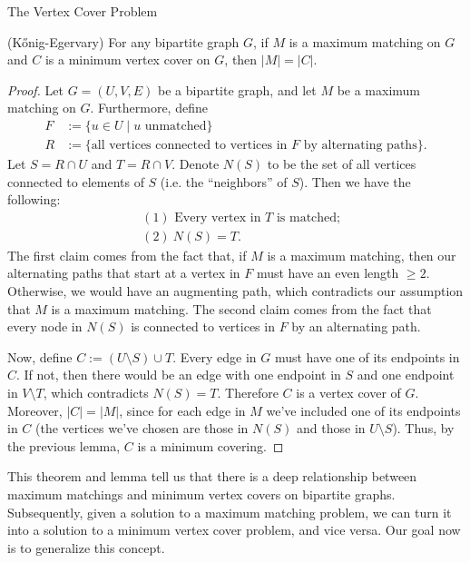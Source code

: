 \begin{section}{The Vertex Cover Problem}
	\begin{theorem}{(K\H{o}nig-Egervary)}
		For any bipartite graph $G$, if $M$ is a maximum matching on $G$ and $C$ is a minimum 
		vertex cover  on $G$, then $|M| = |C|$.
	\end{theorem}
	\begin{proof}
		Let $G=(U,V,E)$ be a bipartite graph, and let $M$ be a maximum matching on $G$. 
		Furthermore, define
		\begin{align}
			F &:= \{u\in U\; |\; u \text{ unmatched}\}\\
			R &:= \{\text{all vertices connected to vertices in $F$ by alternating paths}\}.
		\end{align}
		Let $S = R\cap U$ and $T = R\cap V$. Denote $N(S)$ to be the set of all vertices 
		connected to elements of $S$ (i.e. the ``neighbors'' of $S$). Then we have the following:
		\begin{align*}
			&(1)\text{ Every vertex in $T$ is matched;}\\
			&(2)\ N(S) = T.
		\end{align*}
		The first claim comes from the fact that, if $M$ is a 
		maximum matching, then our alternating paths that start at a vertex in $F$ must have 
		an even length $\geq 2$. Otherwise, we would have an augmenting path, 
		which contradicts our assumption that $M$ is a maximum matching.
		The second claim comes from the fact that every node in $N(S)$ is connected to vertices 
		in $F$ by an alternating path. 

		Now, define $C := (U\setminus S)\cup T$. Every edge 
		in $G$ must have one of its endpoints in $C$. If not, then there would be an 
		edge with one endpoint in $S$ and one endpoint in $V\setminus T$, which contradicts 
		$N(S) = T$. Therefore $C$ is a vertex cover of $G$. Moreover, $|C| = |M|$, since for each 
		edge in $M$ we've included one of its endpoints in $C$ (the vertices we've chosen are 
		those in $N(S)$ and those in $U\setminus S$). Thus, by the previous lemma, $C$ is 
		a minimum covering.
	\end{proof}

	This theorem and lemma tell us that there is a deep relationship between maximum matchings and 
	minimum vertex covers on bipartite graphs. Subsequently, given a solution to a maximum matching 
	problem, we can turn it into a solution to a minimum vertex cover problem, and vice versa. Our 
	goal now is to generalize this concept.
\end{section}

